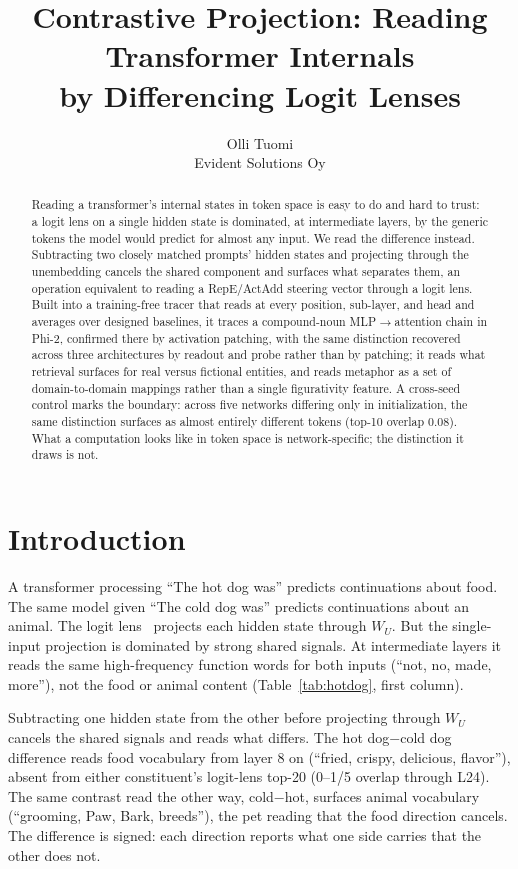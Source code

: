 \documentclass[11pt]{article}
\title{Contrastive Projection: Reading Transformer Internals\\ by Differencing Logit Lenses}
\author{Olli Tuomi\\ Evident Solutions Oy}
\date{}
\newcommand{\WU}{W_U}
\begin{document}
\maketitle

\begin{abstract}
Reading a transformer's internal states in token space is easy to do and hard
to trust: a logit lens on a single hidden state is dominated, at intermediate
layers, by the generic tokens the model would predict for almost any input. We
read the difference instead. Subtracting two closely matched prompts' hidden
states and projecting through the unembedding cancels the shared component and
surfaces what separates them, an operation equivalent to reading a RepE/ActAdd 
steering vector through a logit lens. Built into a training-free tracer that reads at
every position, sub-layer, and head and averages over designed baselines, it
traces a compound-noun MLP$\rightarrow$attention chain in Phi-2, confirmed there
by activation patching, with the same distinction recovered across three
architectures by readout and probe rather than by patching; it reads what
retrieval surfaces for real versus fictional entities, and reads metaphor as a
set of domain-to-domain mappings rather than a single figurativity feature. A
cross-seed control marks the boundary: across five networks differing only in
initialization, the same distinction surfaces as almost entirely different
tokens (top-10 overlap $0.08$). What a computation looks like in token space is
network-specific; the distinction it draws is not.
\end{abstract}

\section{Introduction}

A transformer processing ``The hot dog was'' predicts continuations about food.
The same model given ``The cold dog was'' predicts continuations about an
animal. The logit lens~\citep{nostalgebraist2020} projects each hidden state through
$\WU$. But the single-input projection is dominated by strong shared signals.
At intermediate layers it reads the same high-frequency function words for both
inputs (``not, no, made, more''), not the food or animal content
(Table~\ref{tab:hotdog}, first column).

Subtracting one hidden state from the other before projecting through $\WU$
cancels the shared signals and reads what differs. The hot dog$-$cold dog difference
reads food vocabulary from layer 8 on (``fried, crispy, delicious, flavor''),
absent from either constituent's logit-lens top-20 (0--1/5 overlap through
L24). The same contrast read the other way, cold$-$hot, surfaces animal
vocabulary (``grooming, Paw, Bark, breeds''), the pet reading that the food
direction cancels. The difference is signed: each direction reports what one
side carries that the other does not.
\end{document}
